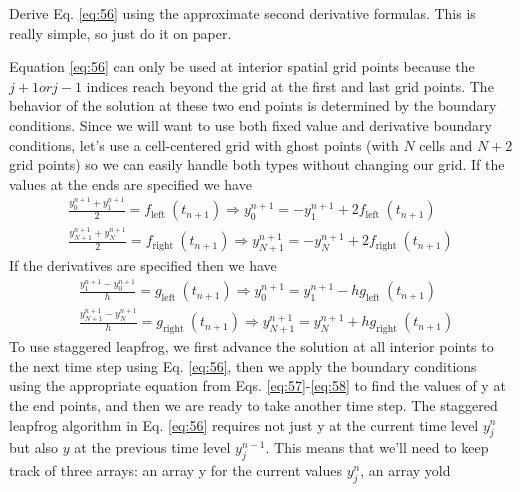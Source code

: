 \begin{problem}\label{P5.1} Derive Eq. \eqref{eq:56} using the approximate second derivative formulas. This is
really simple, so just do it on paper.\end{problem}
Equation \eqref{eq:56} can only be used at interior spatial grid points because the
$ j + 1 {or} j-1$  indices reach beyond the grid at the first and last grid points. The
behavior of the solution at these two end points is determined by the boundary
conditions. Since we will want to use both fixed value and derivative boundary
conditions, let\rq s use a cell-centered grid with ghost points (with $N$ cells and $N+2$ grid points) so we can easily handle both types without changing our grid. If the values at the ends are specified we have 
\begin{equation}\label{eq:57}
\begin{gathered}
\frac{y_{0}^{n+1}+y_{1}^{n+1}}{2}=f_{\text {left }}\left(t_{n+1}\right) \Rightarrow y_{0}^{n+1}=-y_{1}^{n+1}+2 f_{\text {left }}\left(t_{n+1}\right) \\
\frac{y_{N+1}^{n+1}+y_{N}^{n+1}}{2}=f_{\text {right }}\left(t_{n+1}\right) \Rightarrow y_{N+1}^{n+1}=-y_{N}^{n+1}+2 f_{\text {right }}\left(t_{n+1}\right)
\end{gathered}
\end{equation}
If the derivatives are specified then we have
\begin{equation}\label{eq:58}
\begin{aligned}
&\frac{y_{1}^{n+1}-y_{0}^{n+1}}{h}=g_{\text {left }}\left(t_{n+1}\right) \Rightarrow y_{0}^{n+1}=y_{1}^{n+1}-h g_{\text {left }}\left(t_{n+1}\right) \\
&\frac{y_{N+1}^{n+1}-y_{N}^{n+1}}{h}=g_{\text {right }}\left(t_{n+1}\right) \Rightarrow y_{N+1}^{n+1}=y_{N}^{n+1}+h g_{\text {right }}\left(t_{n+1}\right)
\end{aligned}
\end{equation}
To use staggered leapfrog, we first advance the solution at all interior points to
the next time step using Eq. \eqref{eq:56}, then we apply the boundary conditions using
the appropriate equation from Eqs. \eqref{eq:57}-\eqref{eq:58} to find the values of y at the end
points, and then we are ready to take another time step.
The staggered leapfrog algorithm in Eq. \eqref{eq:56} requires not just y at the current
time level $ y_j^n$ but also $y$ at the previous time level $y^{n−1}_j$. This means that we\rq ll need
to keep track of three arrays: an array y for the current values $ y_j^n$, an array yold
